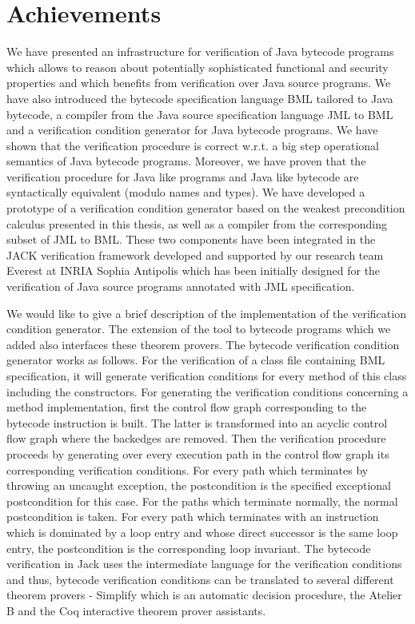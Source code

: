
\section{Achievements}
We have  presented an infrastructure for verification of Java bytecode programs   which allows to reason about potentially
sophisticated  functional and security properties and
which benefits from verification over Java source programs. We have also 
introduced the bytecode specification language BML tailored to Java bytecode, a compiler
from the Java source specification language JML to BML and a verification 
condition generator for Java bytecode programs. 
We have shown that the verification procedure is correct w.r.t. a big step  operational semantics of Java bytecode programs. 
Moreover, we have
proven that the verification procedure for Java like programs
and Java like bytecode are syntactically equivalent (modulo names and types). 
We have developed a prototype of a verification condition generator based on the weakest precondition calculus presented in this thesis, as well 
as a compiler from the corresponding subset of JML to BML.
These two components have been integrated in the JACK \cite{BRL-JACK} verification framework 
developed and supported by our research team Everest at INRIA Sophia Antipolis which has been initially designed for
 the verification of Java source programs annotated with JML specification.

We would like to give a brief description of the implementation of the verification condition generator.
 The extension of the tool to bytecode programs which we added also interfaces these theorem provers. The bytecode 
verification condition generator works as follows. For the verification of a class file containing BML specification, it will generate verification conditions for every
 method of this class including the constructors. For generating the verification conditions concerning a method implementation, first the control flow
 graph corresponding to the bytecode instruction is built. The latter is transformed into an acyclic control flow graph where the backedges are 
removed.
 Then the verification procedure proceeds by generating over every execution path in the control flow graph its corresponding verification conditions. 
For every path which terminates by throwing an uncaught exception, the postcondition is the specified exceptional postcondition for this case. For the paths which terminate normally, 
the normal postcondition is taken. For every path which terminates with an instruction which is dominated by a loop entry and whose direct successor is the same loop entry, the postcondition 
is the corresponding loop invariant. The bytecode verification in Jack uses the intermediate language for the verification conditions and thus, bytecode verification conditions 
 can be translated to several different theorem provers - Simplify \cite{Simpl05DNS} which is an automatic decision procedure, 
the Atelier B and the Coq interactive theorem prover assistants. 

